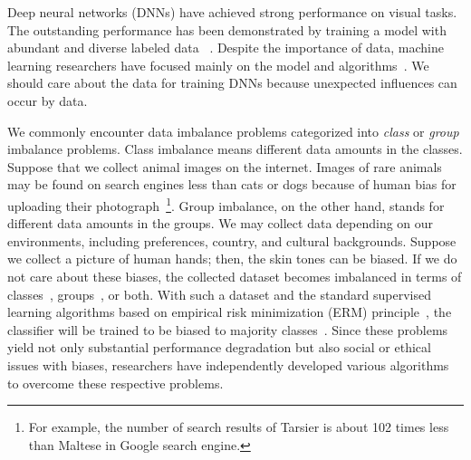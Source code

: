 
Deep neural networks (DNNs) have achieved strong performance on visual tasks.
The outstanding performance has been demonstrated by training a model with abundant and diverse labeled data
~\cite{deng2009imagenet, lin2014microsoft}.
Despite the importance of data, machine learning researchers have focused mainly on the model and algorithms~\cite{sambasivan2021everyone}.
We should care about the data for training DNNs because unexpected influences can occur by data.

We commonly encounter data imbalance problems categorized into \emph{class} or \emph{group} imbalance problems.
Class imbalance means different data amounts in the classes.
Suppose that we collect animal images on the internet.
Images of rare animals may be found on search engines less than cats or dogs because of human bias for uploading their photograph~\footnote{For example, the number of search results of Tarsier is about 102 times less than Maltese in Google search engine.}.
Group imbalance, on the other hand, stands for different data amounts in the groups.
We may collect data depending on our environments, including preferences, country, and cultural backgrounds.
Suppose we collect a picture of human hands; then, the skin tones can be biased.
If we do not care about these biases, the collected dataset becomes imbalanced in terms of classes~\cite{cui2019class,zhang2023deep}, groups~\cite{whang2021responsible}, or both.
With such a dataset and the standard supervised learning algorithms based on empirical risk minimization (ERM) principle~\cite{vapnik1999nature}, the classifier will be trained to 
be biased to majority classes~\cite{geirhos2020shortcut}.
Since these problems yield not only substantial performance degradation but also social or ethical issues with biases, researchers have independently developed various algorithms~\cite{arjovsky2019invariant,bahng2020learning,sagawa2019distributionally,teney2020unshuffling,tartaglione2021end, lee2021learning,LfF,liu2021just, kim2022learning,yao2022improving,hwang2022selecmix,kirichenko2023last,cao2019learning,ren2020balanced,samuel2021distributional, shen2016relay,park2022majority,kim2020m2m,liu2019large,zhang2022correct} to overcome these respective problems.

